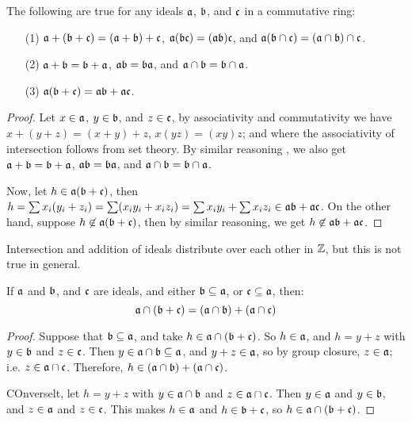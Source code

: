 \pagebreak

\begin{theorem}\label{theorem_1.10.3}
  The following are true for any ideals $\af$,  $\bf$, and $\cf$ in a
  commutative ring:
  \begin{enumerate}
    \item[(1)] $\af+(\bf+\cf)=(\af+\bf)+\cf$, $\af(\bf\cf)=(\af\bf)\cf$, and
      $\af (\bf \cap \cf)=(\af \cap \bf) \cap \cf$.

    \item[(2)] $\af+\bf=\bf+\af$, $\af\bf=\bf\af$, and  $\af \cap \bf=\bf \cap
      \af$.

    \item[(3)] $\af(\bf+\cf)=\af\bf+\af\cf$.
  \end{enumerate}
\end{theorem}
\begin{proof}
  Let $x \in \af$, $y \in \bf$, and $z \in \cf$, by associativity and
  commutativity we have $x+(y+z)=(x+y)+z$, $x(yz)=(xy)z$; and where the
  associativity of intersection follows from set theory. By similar reasoning ,
  we also get  $\af+\bf=\bf+\af$,  $\af\bf=\bf\af$, and  $\af \cap \bf=\bf \cap
  \af$.

  Now, let  $h \in \af(\bf+\cf)$, then
  $h=\sum{x_i(y_i+z_i)}=\sum(x_iy_i+x_iz_i)=\sum{x_iy_i}+\sum{x_iz_i} \in
  \af\bf+\af\cf$. On the other hand, suppose $h \not\in \af(\bf+\cf)$, then by
  similar reasoning, we get $h \not\in \af\bf+\af\cf$.
\end{proof}

\begin{example}\label{example_1.23}
  Intersection and addition of ideals distribute over each other in $\Z$, but
  this is not true in general.
\end{example}

\begin{theorem}[Modularity]\label{theorem}
  If $\af$ and $\bf$, and $\cf$ are ideals, and either $\bf \subseteq \af$, or
  $\cf \subseteq \af$, then:
  \begin{equation*}
    \af \cap (\bf+\cf)=(\af \cap \bf)+(\af \cap \cf)
  \end{equation*}
\end{theorem}
\begin{proof}
  Suppose that $\bf \subseteq \af$, and take $h \in \af \cap (\bf+\cf)$. So $h
  \in \af$, and $h=y+z$ with  $y \in \bf$ and $z \in \cf$. Then $y \in \af \cap
  \bf \subseteq \af$, and $y+z \in \af$, so by group closure, $z \in \af$; i.e.
  $z \in \af \cap \cf$. Therefore, $h \in (\af \cap \bf)+(\af \cap \cf)$.

  COnverselt, let $h=y+z$ with  $y \in \af \cap \bf$ and $z \in \af \cap \cf$.
  Then $y \in \af$ and $y \in \bf$, and $z \in \af$ and $z \in \cf$. This makes
  $h \in \af$ and $h \in \bf+\cf$, so $h \in \af \cap (\bf+\cf)$.
\end{proof}


